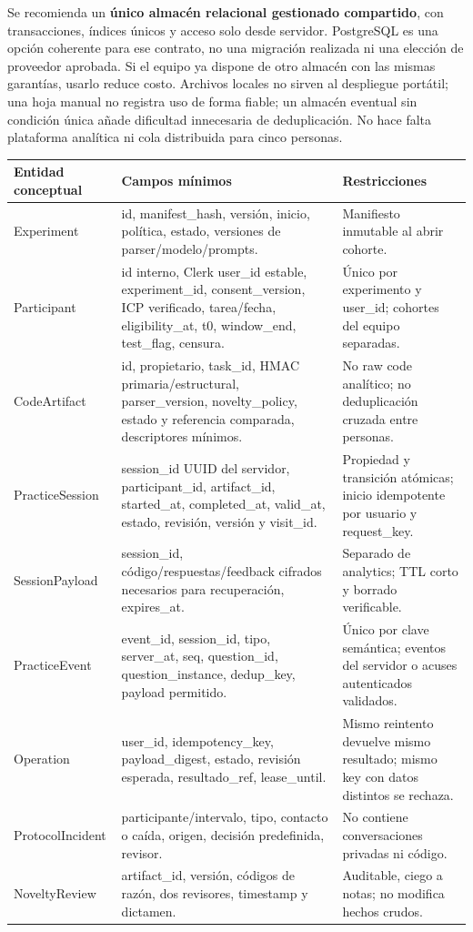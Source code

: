 \documentclass[11pt,a4paper]{report}
\begin{document}
Se recomienda un \textbf{único almacén relacional gestionado compartido}, con transacciones, índices únicos y acceso solo desde servidor. PostgreSQL es una opción coherente para ese contrato, no una migración realizada ni una elección de proveedor aprobada. Si el equipo ya dispone de otro almacén con las mismas garantías, usarlo reduce costo. Archivos locales no sirven al despliegue portátil; una hoja manual no registra uso de forma fiable; un almacén eventual sin condición única añade dificultad innecesaria de deduplicación. No hace falta plataforma analítica ni cola distribuida para cinco personas.

\begin{longtable}{P{3cm}P{8.6cm}P{4.1cm}}
\toprule Entidad conceptual & Campos mínimos & Restricciones \\\midrule\endhead
Experiment & id, manifest\_hash, versión, inicio, política, estado, versiones de parser/modelo/prompts. & Manifiesto inmutable al abrir cohorte.\\
Participant & id interno, Clerk user\_id estable, experiment\_id, consent\_version, ICP verificado, tarea/fecha, eligibility\_at, t0, window\_end, test\_flag, censura. & Único por experimento y user\_id; cohortes del equipo separadas.\\
CodeArtifact & id, propietario, task\_id, HMAC primaria/estructural, parser\_version, novelty\_policy, estado y referencia comparada, descriptores mínimos. & No raw code analítico; no deduplicación cruzada entre personas.\\
PracticeSession & session\_id UUID del servidor, participant\_id, artifact\_id, started\_at, completed\_at, valid\_at, estado, revisión, versión y visit\_id. & Propiedad y transición atómicas; inicio idempotente por usuario y request\_key.\\
SessionPayload & session\_id, código/respuestas/feedback cifrados necesarios para recuperación, expires\_at. & Separado de analytics; TTL corto y borrado verificable.\\
PracticeEvent & event\_id, session\_id, tipo, server\_at, seq, question\_id, question\_instance, dedup\_key, payload permitido. & Único por clave semántica; eventos del servidor o acuses autenticados validados.\\
Operation & user\_id, idempotency\_key, payload\_digest, estado, revisión esperada, resultado\_ref, lease\_until. & Mismo reintento devuelve mismo resultado; mismo key con datos distintos se rechaza.\\
ProtocolIncident & participante/intervalo, tipo, contacto o caída, origen, decisión predefinida, revisor. & No contiene conversaciones privadas ni código.\\
NoveltyReview & artifact\_id, versión, códigos de razón, dos revisores, timestamp y dictamen. & Auditable, ciego a notas; no modifica hechos crudos.\\\bottomrule
\end{longtable}
\end{document}
